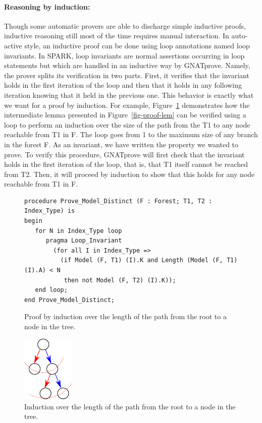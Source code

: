 \documentclass[11pt,a4paper]{article}
\begin{document}
\paragraph{Reasoning by induction:}
Though some automatic provers are able to discharge simple inductive proofs, inductive reasoning
still most of the time requires manual interaction. In auto-active style, an inductive proof can be done
using loop annotations named loop invariants. In SPARK, loop invariants are normal assertions occurring in
loop statements but which are handled in an inductive way by GNATprove. Namely, the prover splits its
verification in two parts. First, it verifies that the invariant holds in the first iteration of the
loop and then that it holds in any following iteration knowing that it held in the previous one.
This behavior is exactly what we want for a proof by induction. For example, Figure~\ref{fig-proof-ind}
demonstrates how the intermediate lemma presented in Figure~\ref{fig-proof-lem} can be verified
using a loop to perform an induction over the size of the path from the T1 to any node reachable
from T1 in F. The loop goes from 1 to the maximum size of any branch in the forest F. As an
invariant, we have written the property we wanted to prove. To verify this procedure, GNATprove will
first check that the invariant holds in the first iteration of the loop, that is, that T1 itself cannot
be reached from T2. Then, it will proceed by induction to show that this holds for any node reachable
from T1 in F.

\begin{figure}
\begin{small}
\begin{lstlisting}
procedure Prove_Model_Distinct (F : Forest; T1, T2 : Index_Type) is
begin
   for N in Index_Type loop
      pragma Loop_Invariant
        (for all I in Index_Type =>
          (if Model (F, T1) (I).K and Length (Model (F, T1) (I).A) < N
           then not Model (F, T2) (I).K));
   end loop;
end Prove_Model_Distinct;
\end{lstlisting}
\end{small}
\caption{\label{fig-proof-ind} Proof by induction over the length of the path from the root to a node in the tree.}
\end{figure}
\begin{figure}[ht]
\begin{center}
\includegraphics[width=25mm]{induction.pdf}
\caption{\label{fig-proof-ind2} Induction over the length of the path from the root to a node in the tree.}
\end{center}
\end{figure}
\end{document}
